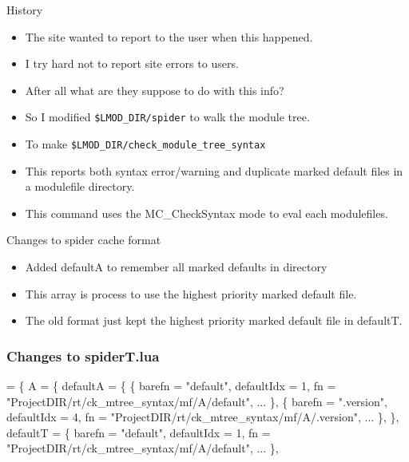 \documentclass{beamer}
\begin{document}
\begin{frame}{History}
  \begin{itemize}
    \item The site wanted to report to the user when this happened.
    \item I try hard not to report site errors to users.
    \item After all what are they suppose to do with this info?
    \item So I modified \texttt{\$LMOD\_DIR/spider} to walk the module
      tree.
    \item To make \texttt{\$LMOD\_DIR/check\_module\_tree\_syntax}
    \item This reports both syntax error/warning and duplicate marked
      default files in a modulefile directory.
    \item This command uses the MC\_CheckSyntax mode to eval each modulefiles.
  \end{itemize}
\end{frame}

\begin{frame}{Changes to spider cache format}
  \begin{itemize}
    \item Added defaultA to remember all marked defaults in directory
    \item This array is process to use the highest priority marked
      default file.
    \item The old format just kept the highest priority marked default
      file in defaultT.
  \end{itemize}
\end{frame}

\begin{frame}[fragile]
    \frametitle{Changes to spiderT.lua}
 {\tiny
    \begin{semiverbatim}
   = \{
    A = \{{\color{blue}
      defaultA = \{
        \{
          barefn = "default",
          defaultIdx = 1,
          fn = "ProjectDIR/rt/ck_mtree_syntax/mf/A/default",
          ...
        \},
        \{
          barefn = ".version",
          defaultIdx = 4,
          fn = "ProjectDIR/rt/ck_mtree_syntax/mf/A/.version",
          ...
        \},
      \},}
      defaultT = \{
        barefn = "default",
        defaultIdx = 1,
        fn = "ProjectDIR/rt/ck_mtree_syntax/mf/A/default",
        ...
      \},
    \end{semiverbatim}
}
\end{frame}
\end{document}
